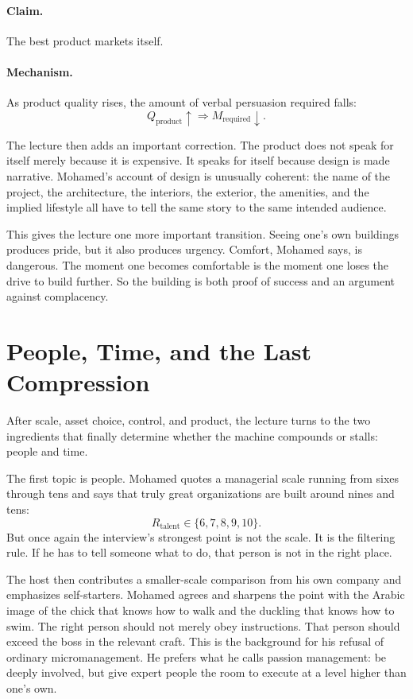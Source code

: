 \paragraph{Claim.} The best product markets itself.

\paragraph{Mechanism.} As product quality rises, the amount of verbal persuasion required falls:
\begin{equation}
Q_{\text{product}} \uparrow
\Longrightarrow
M_{\text{required}} \downarrow.
\end{equation}

The lecture then adds an important correction. The product does not speak for itself merely because it is expensive. It speaks for itself because design is made narrative. Mohamed's account of design is unusually coherent: the name of the project, the architecture, the interiors, the exterior, the amenities, and the implied lifestyle all have to tell the same story to the same intended audience.

This gives the lecture one more important transition. Seeing one's own buildings produces pride, but it also produces urgency. Comfort, Mohamed says, is dangerous. The moment one becomes comfortable is the moment one loses the drive to build further. So the building is both proof of success and an argument against complacency.

\section{People, Time, and the Last Compression}

After scale, asset choice, control, and product, the lecture turns to the two ingredients that finally determine whether the machine compounds or stalls: people and time.

The first topic is people. Mohamed quotes a managerial scale running from sixes through tens and says that truly great organizations are built around nines and tens:
\begin{equation}
R_{\text{talent}} \in \{6,7,8,9,10\}.
\end{equation}
But once again the interview's strongest point is not the scale. It is the filtering rule. If he has to tell someone what to do, that person is not in the right place.

The host then contributes a smaller-scale comparison from his own company and emphasizes self-starters. Mohamed agrees and sharpens the point with the Arabic image of the chick that knows how to walk and the duckling that knows how to swim. The right person should not merely obey instructions. That person should exceed the boss in the relevant craft. This is the background for his refusal of ordinary micromanagement. He prefers what he calls passion management: be deeply involved, but give expert people the room to execute at a level higher than one's own.

